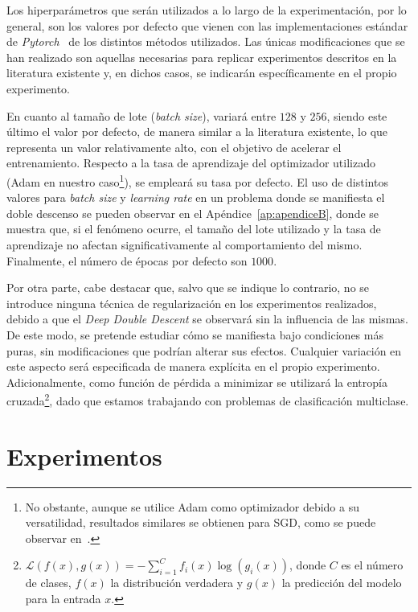 Los hiperparámetros que serán utilizados a lo largo de la experimentación, por lo general, son los valores por defecto que vienen con las implementaciones estándar de \textit{Pytorch}~\cite{NEURIPS2019_9015} de los distintos métodos utilizados. Las únicas modificaciones que se han realizado son aquellas necesarias para replicar experimentos descritos en la literatura existente y, en dichos casos, se indicarán específicamente en el propio experimento.

En cuanto al tamaño de lote (\textit{batch size}), variará entre $128$ y $256$, siendo este último el valor por defecto, de manera similar a la literatura existente, lo que representa un valor relativamente alto, con el objetivo de acelerar el entrenamiento. Respecto a la tasa de aprendizaje del optimizador utilizado (Adam en nuestro caso\footnote{No obstante, aunque se utilice Adam como optimizador debido a su versatilidad, resultados similares se obtienen para SGD, como se puede observar en~\cite{Nakkiran2019}.}), se empleará su tasa por defecto. El uso de distintos valores para \textit{batch size} y \textit{learning rate} en un problema donde se manifiesta el doble descenso se pueden observar en el Apéndice~\ref{ap:apendiceB}, donde se muestra que, si el fenómeno ocurre, el tamaño del lote utilizado y la tasa de aprendizaje no afectan significativamente al comportamiento del mismo. Finalmente, el número de épocas por defecto son $1000$.

Por otra parte, cabe destacar que, salvo que se indique lo contrario, no se introduce ninguna técnica de regularización en los experimentos realizados, debido a que el \textit{Deep Double Descent} se observará sin la influencia de las mismas. De este modo, se pretende estudiar cómo se manifiesta bajo condiciones más puras, sin modificaciones que podrían alterar sus efectos. Cualquier variación en este aspecto será especificada de manera explícita en el propio experimento. Adicionalmente, como función de pérdida a minimizar se utilizará la entropía cruzada\footnote{$\mathcal{L}(f(x), g(x)) = - \sum_{i=1}^{C} f_i(x) \log(g_i(x))$, donde $C$ es el número de clases, $f(x)$ la distribución verdadera y $g(x)$ la predicción del modelo para la entrada $x$.}, dado que estamos trabajando con problemas de clasificación multiclase.

\section{Experimentos}\label{sec:experimentos}

